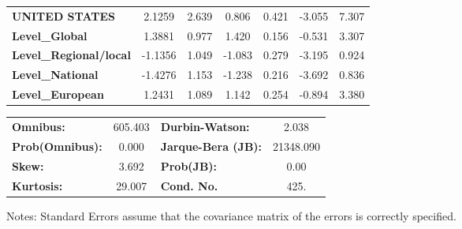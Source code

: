 \documentclass[ 11pt]{article}
\begin{document}
\begin{center}
\begin{tabular}{lcccccc}
\textbf{UNITED STATES}         &       2.1259  &        2.639     &     0.806  &         0.421        &       -3.055    &        7.307     \\
\textbf{Level\_Global}         &       1.3881  &        0.977     &     1.420  &         0.156        &       -0.531    &        3.307     \\
\textbf{Level\_Regional/local} &      -1.1356  &        1.049     &    -1.083  &         0.279        &       -3.195    &        0.924     \\
\textbf{Level\_National}       &      -1.4276  &        1.153     &    -1.238  &         0.216        &       -3.692    &        0.836     \\
\textbf{Level\_European}       &       1.2431  &        1.089     &     1.142  &         0.254        &       -0.894    &        3.380     \\
\bottomrule
\end{tabular}
\begin{tabular}{lclc}
\textbf{Omnibus:}       & 605.403 & \textbf{  Durbin-Watson:     } &     2.038  \\
\textbf{Prob(Omnibus):} &   0.000 & \textbf{  Jarque-Bera (JB):  } & 21348.090  \\
\textbf{Skew:}          &   3.692 & \textbf{  Prob(JB):          } &      0.00  \\
\textbf{Kurtosis:}      &  29.007 & \textbf{  Cond. No.          } &      425.  \\
\bottomrule
\end{tabular}
\end{center}

Notes: \newline
 [1] Standard Errors assume that the covariance matrix of the errors is correctly specified.
 
\end{document}
